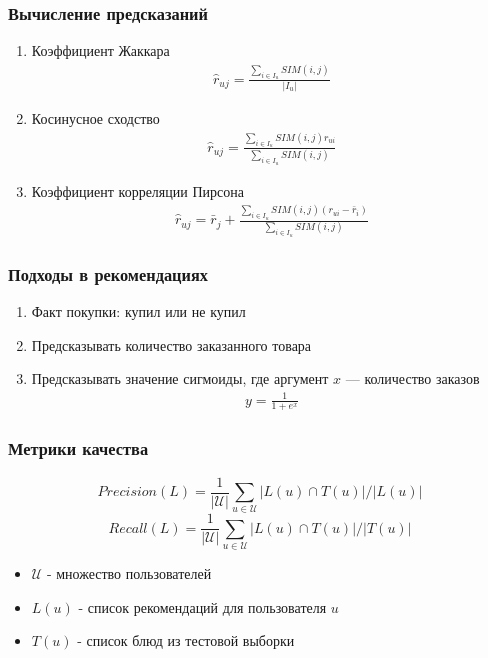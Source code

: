 \documentclass[10pt, unicode]{beamer}
\begin{document}
\begin{frame}
  \frametitle{Вычисление предсказаний}
  \begin{enumerate}
    \item Коэффициент Жаккара
    \begin{align*}
      \hat{r}_{uj} = \frac{\sum_{i \in I_u} SIM(i,j)}{|I_u|}
    \end{align*}
    \item Косинусное сходство
    \begin{align*}
      \hat{r}_{uj} = \frac{\sum_{i \in I_u} SIM(i,j) r_{ui} }{\sum_{i \in I_u} SIM(i,j)}
    \end{align*}
    \item Коэффициент корреляции Пирсона
    \begin{align*}
      \hat{r}_{uj} = \bar{r}_j + \frac{\sum_{i \in I_u} SIM(i,j) (r_{ui} - \bar{r}_i) }{\sum_{i \in I_u} SIM(i,j)}
    \end{align*}
  \end{enumerate}
\end{frame}

\begin{frame}
  \frametitle{Подходы в рекомендациях}
  \begin{enumerate}
    \item Факт покупки: купил или не купил
    \item Предсказывать количество заказанного товара
    \item Предсказывать значение сигмоиды, где аргумент $x$ --- количество заказов
    \begin{align*}
      y = \frac{1}{1 + e^x}
    \end{align*}
  \end{enumerate}
\end{frame}

\begin{frame}
  \frametitle{Метрики качества}
  \begin{equation}
    Precision(L) = \frac{1}{|\mathcal{U}|} \sum_{u \in \mathcal{U}} |L(u) \cap T(u)| / |L(u)|
  \end{equation}
  \begin{equation}
    Recall(L) = \frac{1}{|\mathcal{U}|} \sum_{u \in \mathcal{U}} |L(u) \cap T(u)| / |T(u)|
  \end{equation}
  \begin{itemize}
    \item $\mathcal{U}$ - множество пользователей
    \item $L(u)$ - список рекомендаций для пользователя $u$
    \item $T(u)$ - список блюд из тестовой выборки
  \end{itemize}
\end{frame}
\end{document}
